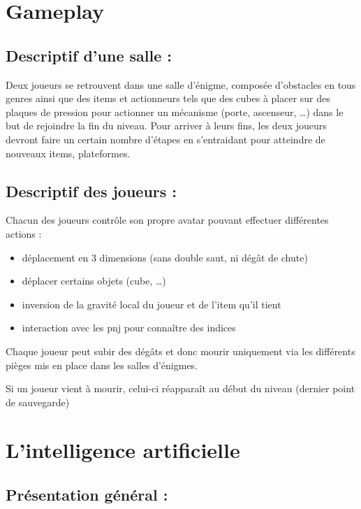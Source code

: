 \documentclass[a4paper,11pt]{article}
\begin{document}
\section{Gameplay}

\subsection{Descriptif d’une salle :} 

Deux joueurs se retrouvent dans une salle d'énigme, 
composée d’obstacles en tous genres ainsi que des items et actionneurs tels que des cubes 
à placer sur des plaques de pression pour actionner un mécanisme (porte, ascenseur, …) dans 
le but de rejoindre la fin du niveau. Pour arriver à leurs fins, les deux joueurs devront faire 
un certain nombre d’étapes en s’entraidant pour atteindre de nouveaux items, plateformes.\newline

\subsection{Descriptif des joueurs :} 

Chacun des joueurs contrôle son propre avatar pouvant effectuer différentes actions : 
\newline

\begin{itemize}
    \item déplacement en 3 dimensions (sans double saut, ni dégât de chute)
    \item déplacer certains objets (cube, …)
    \item inversion de la gravité local du joueur et de l’item qu’il tient
    \item interaction avec les pnj pour connaître des indices \newline
\end{itemize}



Chaque joueur peut subir des dégâts et donc mourir uniquement via les différents pièges
 mis en place dans les salles d'énigmes.

Si un joueur vient à mourir, celui-ci réapparaît au début du niveau (dernier point de sauvegarde) 

\section{L’intelligence artificielle}

\subsection{Présentation général :}
\end{document}

